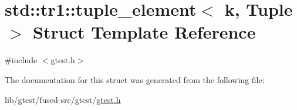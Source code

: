 \hypertarget{structstd_1_1tr1_1_1tuple__element}{\section{std\-:\-:tr1\-:\-:tuple\-\_\-element$<$ k, Tuple $>$ Struct Template Reference}
\label{structstd_1_1tr1_1_1tuple__element}
}


{\ttfamily \#include $<$gtest.\-h$>$}



The documentation for this struct was generated from the following file\-:\begin{DoxyCompactItemize}
\item 
lib/gtest/fused-\/src/gtest/\hyperlink{fused-src_2gtest_2gtest_8h}{gtest.\-h}\end{DoxyCompactItemize}
